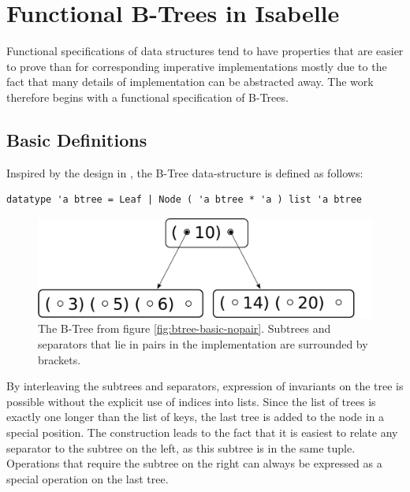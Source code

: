 

\chapter{Functional B-Trees in Isabelle}\label{chapter:abs-set}

Functional specifications of data structures tend to have properties that
are easier to prove than for corresponding imperative implementations
mostly due to the fact that many details of implementation can be abstracted away.
The work therefore begins with a functional specification of B-Trees.

\section{Basic Definitions}
\label{sec:basic-defs}


Inspired by the design in \parencite{DBLP:conf/popl/MalechaMSW10}, the B-Tree data-structure is defined as follows:

\begin{lstlisting}[mathescape=true, language=Isabelle,label=lst:btree-def]
datatype 'a btree = Leaf | Node ( 'a btree * 'a ) list 'a btree
\end{lstlisting}

\begin{figure}
    \centering
    \includegraphics[width=0.5\linewidth]{figures/btree-basic.pdf}
    \caption{The B-Tree from figure \autoref{fig:btree-basic-nopair}.
    Subtrees and separators that lie in pairs in the implementation are surrounded by brackets.}
    \label{fig:btree-basic}
\end{figure}

By interleaving the subtrees and separators, expression of invariants
on the tree is possible without the explicit use of indices into lists.
Since the list of trees is exactly one longer than the list of keys,
the last tree is added to the node in a special position.
The construction leads to the fact that it is easiest to relate any separator
to the subtree on the left, as this subtree is in the same tuple.
Operations that require the subtree on the right can always be expressed as a special
operation on the last tree.

